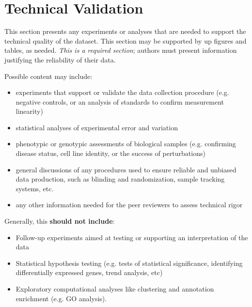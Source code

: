\section{Technical Validation}

This section presents any experiments or analyses that are needed to support the technical quality of the dataset.  This section may be supported by up figures and tables, as needed. \textit{This is a required section}; authors must present information justifying the reliability of their data. 

Possible content may include:
\begin{itemize}
\item experiments that support or validate the data collection procedure (e.g. negative controls, or an analysis of standards to confirm measurement linearity)
\item statistical analyses of experimental error and variation
\item phenotypic or genotypic assessments of biological samples (e.g. confirming disease status, cell line identity, or the success of perturbations)
\item general discussions of any procedures used to ensure reliable and unbiased data production, such as blinding and randomization, sample tracking systems, etc. 
\item any other information needed for the peer reviewers to assess technical rigor
\end{itemize}

Generally, this \textbf{should not include}:
\begin{itemize}
\item Follow-up experiments aimed at testing or supporting an interpretation of the data
\item Statistical hypothesis testing (e.g. tests of statistical significance, identifying differentially expressed genes, trend analysis, etc)
\item Exploratory computational analyses like clustering and annotation enrichment (e.g. GO analysis). 
\end{itemize}
